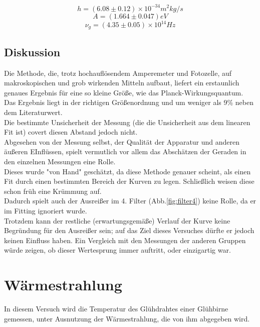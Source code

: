 \documentclass[12pt,a4paper]{article}
\begin{document}
\begin{multicols}{2}


\noindent $$h=(6.08 \pm 0.12)\times 10^{-34} m^2kg/s$$
$$A=(1.664\pm 0.047)eV$$
$$\nu_g=(4.35\pm 0.05)\times 10^{14} Hz$$



\subsection{Diskussion}

Die Methode, die, trotz hochauflösendem Amperemeter und Fotozelle, auf makroskopischen und grob wirkenden Mitteln aufbaut, liefert ein erstaunlich genaues Ergebnis für eine so kleine Größe, wie das Planck-Wirkungsquantum. Das Ergebnis liegt in der richtigen Größenordnung und um weniger als 9\% neben dem Literaturwert.\\
Die bestimmte Unsicherheit der Messung (die die Unsicherheit aus dem linearen Fit ist) covert diesen Abstand jedoch nicht.\\
Abgesehen von der Messung selbst, der Qualität der Apparatur und anderen äußeren EInflüssen, spielt vermutlich vor allem das Abschätzen der Geraden in den einzelnen Messungen eine Rolle.\\
Dieses wurde "von Hand" geschätzt, da diese Methode genauer scheint, als einen Fit durch einen bestimmten Bereich der Kurven zu legen. Schließlich weisen diese schon früh eine Krümmung auf.\\
Dadurch spielt auch der Ausreißer im 4. Filter (Abb.\ref{fig:filter4}) keine Rolle, da er im Fitting ignoriert wurde.\\
Trotzdem kann der restliche (erwartungsgemäße) Verlauf der Kurve  keine Begründung für den Ausreißer sein; auf das Ziel dieses Versuches dürfte er jedoch keinen Einfluss haben. Ein Vergleich mit den Messungen der anderen Gruppen würde zeigen, ob dieser Wertesprung immer auftritt, oder einzigartig war.\\



\section{Wärmestrahlung}

In diesem Versuch wird die Temperatur des Glühdrahtes einer Glühbirne gemessen, unter Ausnutzung der Wärmestrahlung, die von ihm abgegeben wird.


\end{multicols}
\end{document}

